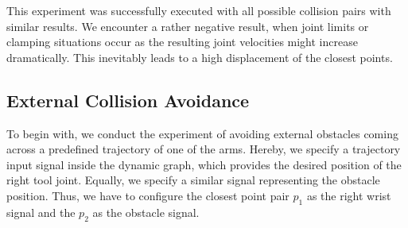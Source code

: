 This experiment was successfully executed with all possible collision pairs with similar results. We encounter a rather negative result, when joint limits or clamping situations occur as the resulting joint velocities might increase dramatically. This inevitably leads to a high displacement of the closest points.
\clearpage
\newpage
\newpage
\subsection{External Collision Avoidance}
To begin with, we conduct the experiment of avoiding external obstacles coming across a predefined trajectory of one of the arms. Hereby, we specify a trajectory input signal inside the dynamic graph, which provides the desired position of the right tool joint. Equally, we specify a similar signal representing the obstacle position. Thus, we have to configure the closest point pair $p_1$ as the right wrist signal and the $p_2$ as the obstacle signal. 

